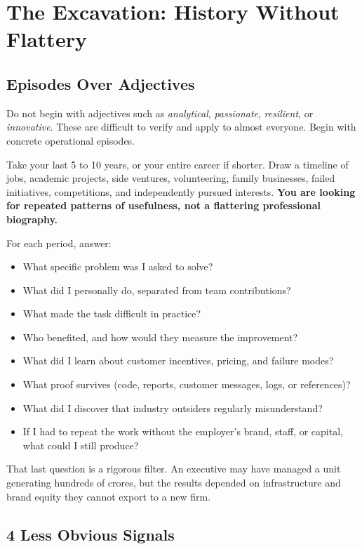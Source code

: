 \section{The Excavation: History Without Flattery}

\subsection{Episodes Over Adjectives}

Do not begin with adjectives such as \textit{analytical}, \textit{passionate}, \textit{resilient}, or \textit{innovative}. These are difficult to verify and apply to almost everyone. Begin with concrete operational episodes.

Take your last 5 to 10 years, or your entire career if shorter. Draw a timeline of jobs, academic projects, side ventures, volunteering, family businesses, failed initiatives, competitions, and independently pursued interests. \textbf{You are looking for repeated patterns of usefulness, not a flattering professional biography.}

For each period, answer:

\begin{itemize}[leftmargin=11pt,itemsep=1.5pt,topsep=1.5pt,parsep=0pt]
  \item What specific problem was I asked to solve?
  \item What did I personally do, separated from team contributions?
  \item What made the task difficult in practice?
  \item Who benefited, and how would they measure the improvement?
  \item What did I learn about customer incentives, pricing, and failure modes?
  \item What proof survives (code, reports, customer messages, logs, or references)?
  \item What did I discover that industry outsiders regularly misunderstand?
  \item If I had to repeat the work without the employer's brand, staff, or capital, what could I still produce?
\end{itemize}

That last question is a rigorous filter. An executive may have managed a unit generating hundreds of crores, but the results depended on infrastructure and brand equity they cannot export to a new firm.

\subsection{4 Less Obvious Signals}

